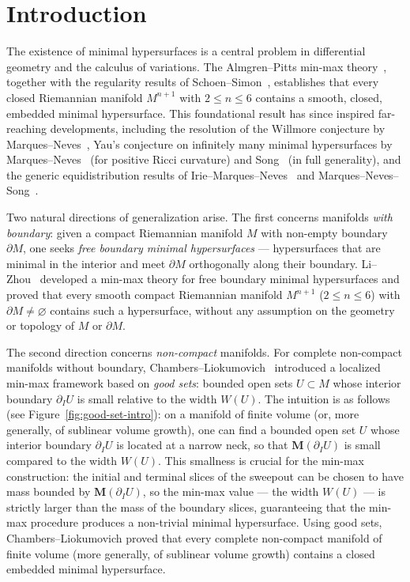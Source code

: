 \section{Introduction}
\label{ch:intro}

The existence of minimal hypersurfaces is a central problem in differential geometry and the calculus of variations. The Almgren--Pitts min-max theory~\cite{Alm65, Pit81}, together with the regularity results of Schoen--Simon~\cite{SS81}, establishes that every closed Riemannian manifold $M^{n+1}$ with $2 \leq n \leq 6$ contains a smooth, closed, embedded minimal hypersurface. This foundational result has since inspired far-reaching developments, including the resolution of the Willmore conjecture by Marques--Neves~\cite{MN14}, Yau's conjecture on infinitely many minimal hypersurfaces by Marques--Neves~\cite{MN17} (for positive Ricci curvature) and Song~\cite{Song18} (in full generality), and the generic equidistribution results of Irie--Marques--Neves~\cite{IMN17} and Marques--Neves--Song~\cite{MNS}.

Two natural directions of generalization arise. The first concerns manifolds \emph{with boundary}: given a compact Riemannian manifold $M$ with non-empty boundary $\partial M$, one seeks \emph{free boundary minimal hypersurfaces} --- hypersurfaces that are minimal in the interior and meet $\partial M$ orthogonally along their boundary. Li--Zhou~\cite{LZ17} developed a min-max theory for free boundary minimal hypersurfaces and proved that every smooth compact Riemannian manifold $M^{n+1}$ ($2 \leq n \leq 6$) with $\partial M \neq \varnothing$ contains such a hypersurface, without any assumption on the geometry or topology of $M$ or $\partial M$.

The second direction concerns \emph{non-compact} manifolds. For complete non-compact manifolds without boundary, Chambers--Liokumovich~\cite{CL20} introduced a localized min-max framework based on \emph{good sets}: bounded open sets $U \subset M$ whose interior boundary $\partial_I U$ is small relative to the width $W(U)$. The intuition is as follows (see Figure~\ref{fig:good-set-intro}): on a manifold of finite volume (or, more generally, of sublinear volume growth), one can find a bounded open set $U$ whose interior boundary $\partial_I U$ is located at a narrow neck, so that $\mathbf{M}(\partial_I U)$ is small compared to the width $W(U)$. This smallness is crucial for the min-max construction: the initial and terminal slices of the sweepout can be chosen to have mass bounded by $\mathbf{M}(\partial_I U)$, so the min-max value --- the width $W(U)$ --- is strictly larger than the mass of the boundary slices, guaranteeing that the min-max procedure produces a non-trivial minimal hypersurface. Using good sets, Chambers--Liokumovich proved that every complete non-compact manifold of finite volume (more generally, of sublinear volume growth) contains a closed embedded minimal hypersurface.

